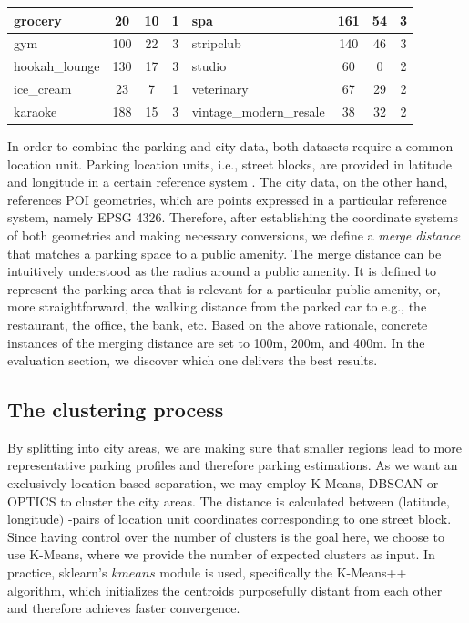 \begin{table}[!ht]
{\begin{tabular}{ | l | c | c | c || l | c | c | c |}
				grocery  & 20 & 10 & 1 &  spa  & 161 & 54 & 3 \\ \hline
				gym  & 100 & 22 & 3 &  stripclub  & 140 & 46 & 3 \\ \hline
				hookah\_lounge  & 130 & 17 & 3 &  studio  & 60 & 0 & 2 \\ \hline
				ice\_cream  & 23 & 7 & 1 &  veterinary  & 67 & 29 & 2 \\ \hline
				karaoke  & 188 & 15 & 3 & {\scriptsize vintage\_modern\_resale}  & 38 & 32 & 2 \\ \hline
		\end{tabular}}
		\label{tab:amenities_google_places}
	\end{table}  
	
	In order to combine the parking and city data, both datasets require a common location unit. Parking location units, i.e., street blocks, are provided in latitude and longitude in a certain reference system . The city data, on the other hand, references POI geometries, which are points expressed in a particular reference system, namely EPSG 4326. Therefore, after establishing the coordinate systems of both geometries and making necessary conversions, we define a \textit{merge distance} that matches a parking space to a public amenity. The merge distance can be intuitively understood as the radius around a public amenity. It is defined to represent the parking area that is relevant for a particular public amenity, or, more straightforward, the walking distance from the parked car to e.g., the restaurant, the office, the bank, etc. Based on the above rationale, concrete instances of the merging distance are set to 100m, 200m, and 400m. In the evaluation section, we discover which one delivers the best results.
	
	\subsection{The clustering process}
	By splitting into city areas, we are making sure that smaller regions lead to more representative parking profiles and therefore parking estimations. As we want an exclusively location-based separation, we may employ K-Means, DBSCAN or OPTICS to cluster the city areas. The distance is calculated between $($latitude$,$ longitude$)$ -pairs of location unit coordinates corresponding to one street block. Since having control over the number of clusters is the goal here, we choose to use K-Means, where we provide the number of expected clusters as input.  In practice, sklearn's $kmeans$ module is used, specifically the K-Means++ algorithm, which initializes the centroids purposefully distant from each other and therefore achieves faster convergence.
	

